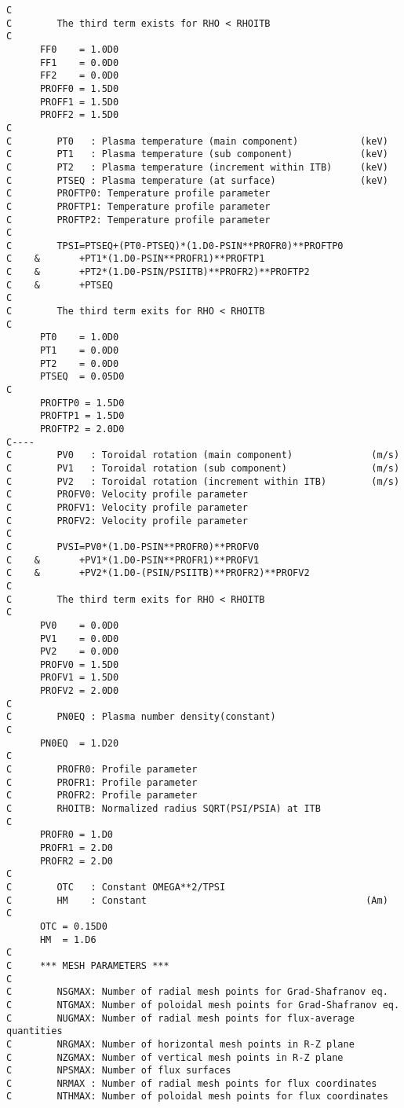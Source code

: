 \documentclass[11pt]{article}
\begin{document}
{\begin{verbatim}
C
C        The third term exists for RHO < RHOITB
C
      FF0    = 1.0D0
      FF1    = 0.0D0
      FF2    = 0.0D0
      PROFF0 = 1.5D0
      PROFF1 = 1.5D0
      PROFF2 = 1.5D0
C
C        PT0   : Plasma temperature (main component)           (keV)
C        PT1   : Plasma temperature (sub component)            (keV)
C        PT2   : Plasma temperature (increment within ITB)     (keV)
C        PTSEQ : Plasma temperature (at surface)               (keV)
C        PROFTP0: Temperature profile parameter
C        PROFTP1: Temperature profile parameter
C        PROFTP2: Temperature profile parameter
C
C        TPSI=PTSEQ+(PT0-PTSEQ)*(1.D0-PSIN**PROFR0)**PROFTP0
C    &       +PT1*(1.D0-PSIN**PROFR1)**PROFTP1
C    &       +PT2*(1.D0-PSIN/PSIITB)**PROFR2)**PROFTP2
C    &       +PTSEQ
C
C        The third term exits for RHO < RHOITB
C
      PT0    = 1.0D0
      PT1    = 0.0D0
      PT2    = 0.0D0
      PTSEQ  = 0.05D0
C
      PROFTP0 = 1.5D0
      PROFTP1 = 1.5D0
      PROFTP2 = 2.0D0
C----
C        PV0   : Toroidal rotation (main component)              (m/s)
C        PV1   : Toroidal rotation (sub component)               (m/s)
C        PV2   : Toroidal rotation (increment within ITB)        (m/s)
C        PROFV0: Velocity profile parameter
C        PROFV1: Velocity profile parameter
C        PROFV2: Velocity profile parameter
C
C        PVSI=PV0*(1.D0-PSIN**PROFR0)**PROFV0
C    &       +PV1*(1.D0-PSIN**PROFR1)**PROFV1
C    &       +PV2*(1.D0-(PSIN/PSIITB)**PROFR2)**PROFV2
C
C        The third term exits for RHO < RHOITB
C
      PV0    = 0.0D0
      PV1    = 0.0D0
      PV2    = 0.0D0
      PROFV0 = 1.5D0
      PROFV1 = 1.5D0
      PROFV2 = 2.0D0
C
C        PN0EQ : Plasma number density(constant)
C
      PN0EQ  = 1.D20
C
C        PROFR0: Profile parameter
C        PROFR1: Profile parameter
C        PROFR2: Profile parameter
C        RHOITB: Normalized radius SQRT(PSI/PSIA) at ITB
C
      PROFR0 = 1.D0
      PROFR1 = 2.D0
      PROFR2 = 2.D0
C
C        OTC   : Constant OMEGA**2/TPSI
C        HM    : Constant                                       (Am)
C
      OTC = 0.15D0
      HM  = 1.D6
C
C     *** MESH PARAMETERS ***
C
C        NSGMAX: Number of radial mesh points for Grad-Shafranov eq.
C        NTGMAX: Number of poloidal mesh points for Grad-Shafranov eq.
C        NUGMAX: Number of radial mesh points for flux-average quantities
C        NRGMAX: Number of horizontal mesh points in R-Z plane
C        NZGMAX: Number of vertical mesh points in R-Z plane
C        NPSMAX: Number of flux surfaces
C        NRMAX : Number of radial mesh points for flux coordinates
C        NTHMAX: Number of poloidal mesh points for flux coordinates

\end{verbatim}}
\end{document}

